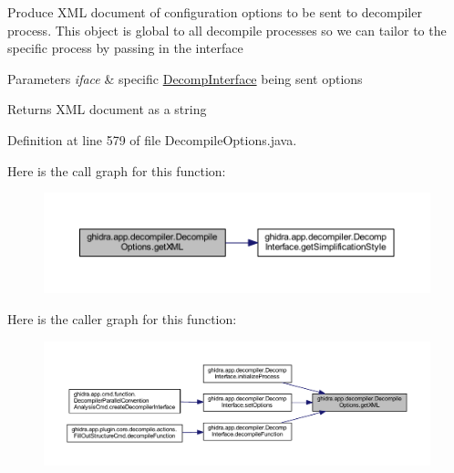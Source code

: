 Produce X\+ML document of configuration options to be sent to decompiler process. This object is global to all decompile processes so we can tailor to the specific process by passing in the interface 
\begin{DoxyParams}{Parameters}
{\em iface} & specific \mbox{\hyperlink{classghidra_1_1app_1_1decompiler_1_1_decomp_interface}{Decomp\+Interface}} being sent options \\
\hline
\end{DoxyParams}
\begin{DoxyReturn}{Returns}
X\+ML document as a string 
\end{DoxyReturn}


Definition at line 579 of file Decompile\+Options.\+java.

Here is the call graph for this function\+:
\nopagebreak
\begin{figure}[H]
\begin{center}
\leavevmode
\includegraphics[width=350pt]{classghidra_1_1app_1_1decompiler_1_1_decompile_options_a126d2a13ecf64fdd20b32214084795b6_cgraph}
\end{center}
\end{figure}
Here is the caller graph for this function\+:
\nopagebreak
\begin{figure}[H]
\begin{center}
\leavevmode
\includegraphics[width=350pt]{classghidra_1_1app_1_1decompiler_1_1_decompile_options_a126d2a13ecf64fdd20b32214084795b6_icgraph}
\end{center}
\end{figure}
\mbox{\label{classghidra_1_1app_1_1decompiler_1_1_decompile_options_ac131faeedb338752984bd62826882313}} 
